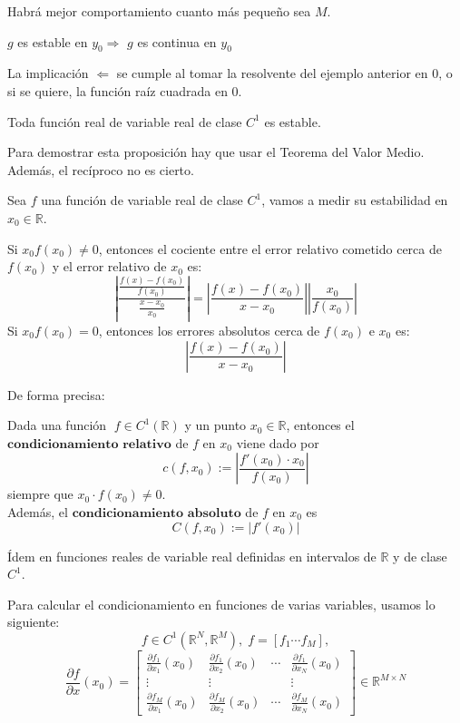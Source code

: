 Habrá mejor comportamiento cuanto más pequeño sea $M$.

\begin{nprop}
$g$ es estable en $y_0 \Rightarrow$ $g$ es continua en $y_0$ 
\end{nprop}

La implicación $\Leftarrow$ se cumple al tomar la resolvente del ejemplo anterior en 0, o si se quiere, la función raíz cuadrada en 0.

\begin{nprop}
Toda función real de variable real de clase $C^1$ es estable.
\end{nprop}

Para demostrar esta proposición hay que usar el Teorema del Valor Medio. Además, el recíproco no es cierto.

Sea $f$ una función de variable real de clase $C^1$, vamos a medir su estabilidad en $x_0 \in \mathbb{R}$.

Si $x_0f(x_0) \neq 0$, entonces el cociente entre el error relativo cometido cerca de $f(x_0)$ y el error relativo de $x_0$ es:
\[ \left\vert \frac{\frac{f(x) - f(x_0)}{f(x_0)}}{\frac{x - x_0}{x_0}} \right\vert = \left\vert \frac{f(x) - f(x_0)}{x - x_0} \right\vert \left\vert \frac{x_0}{f(x_0)} \right\vert \]
Si $x_0f(x_0) = 0$, entonces los errores absolutos cerca de $f(x_0)$ e $x_0$ es:
\[ \left\vert \frac{f(x) - f(x_0)}{x - x_0} \right\vert \]

De forma precisa:

\begin{ndef}
Dada una función $\;f \in C^1(\mathbb{R})$ y un punto $x_0 \in \mathbb{R}$, entonces el $\textbf{condicionamiento relativo}$ de $f$ en $x_0$ viene dado por
\[ c(f, x_0) := \left\vert \frac{f'(x_0)\cdot x_0}{f(x_0)} \right\vert \]
siempre que $x_0\cdot f(x_0) \neq 0$.\\
Además, el $\textbf{condicionamiento absoluto}$ de $f$ en $x_0$ es
\[ C(f, x_0) := \vert f'(x_0) \vert \]
\end{ndef}

Ídem en funciones reales de variable real definidas en intervalos de $\mathbb{R}$ y de clase $C^1$.

Para calcular el condicionamiento en funciones de varias variables, usamos lo siguiente:
\[ f \in C^1 ( \mathbb{R}^N, \mathbb{R}^M), \; f = \left[ f_1 \cdots f_M \right], \]
\[ \frac{\partial f}{\partial x} (x_0) = \begin{bmatrix}
\frac{\partial f_1}{\partial x_1} (x_0) & \frac{\partial f_1}{\partial x_2} (x_0) & \cdots & \frac{\partial f_1}{\partial x_N} (x_0) \\
\vdots & \vdots & & \vdots \\
\frac{\partial f_M}{\partial x_1} (x_0) & \frac{\partial f_M}{\partial x_2} (x_0) & \cdots & \frac{\partial f_M}{\partial x_N} (x_0)
\end{bmatrix} \in \mathbb{R}^{M \times N} \]

